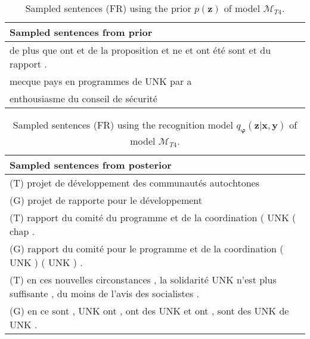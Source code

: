 \begin{table}
  \centering
  \begin{tabular}{|L{14cm}|} 
    \hline
    Sampled sentences from prior\\
    \hline\hline
    de plus que ont et de la proposition et ne et ont été sont et du rapport .\\
    \hline
    mecque pays en programmes de UNK par a \\
    \hline
    enthousiasme du conseil de sécurité\\
    \hline
  \end{tabular}
  \caption{Sampled sentences (FR) using the prior $p(\bm{z})$ of model $\mathcal{M}_{T4}$.}
\end{table}

\begin{table}
  \centering
  \begin{tabular}{|L{14cm}|} 
    \hline
    Sampled sentences from posterior\\ [0.5ex] 
    \hline\hline
    (T) projet de développement des communautés autochtones\\
    (G) projet de rapporte pour le développement\\
    \hline
    (T) rapport du comité du programme et de la coordination ( UNK ( chap .\\
    (G) rapport du comité pour le programme et de la coordination ( UNK ) ( UNK ) .\\
    \hline
    (T) en ces nouvelles circonstances , la solidarité UNK n’est plus suffisante , du moins de l’avis des socialistes .\\
    (G) en ce sont , UNK ont , ont des UNK et ont , sont des UNK de UNK .\\
    \hline
  \end{tabular}
  \caption{Sampled sentences (FR) using the recognition model
    $q_{\bm{\varphi}}(\bm{z} | \bm{x}, \bm{y})$ of model $\mathcal{M}_{T4}$.}
\end{table}

